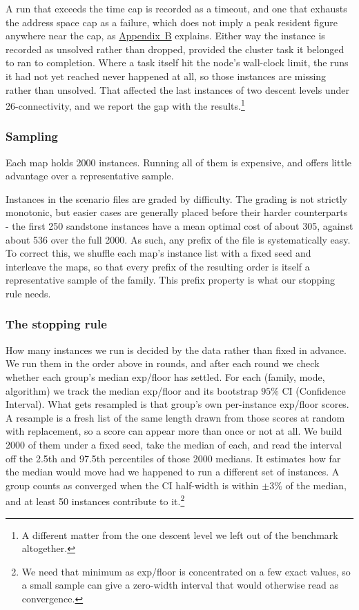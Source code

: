 \documentclass[letterpaper]{article} %
\begin{document}
A run that exceeds the time cap is recorded as a timeout, and one that exhausts the address space cap as a failure, which does not imply a peak resident figure anywhere near the cap, as \hyperref[app:b]{Appendix~B} explains. Either way the instance is recorded as unsolved rather than dropped, provided the cluster task it belonged to ran to completion. Where a task itself hit the node's wall-clock limit, the runs it had not yet reached never happened at all, so those instances are missing rather than unsolved. That affected the last instances of two descent levels under 26-connectivity, and we report the gap with the results.\footnote{A different matter from the one descent level we left out of the benchmark altogether.}

\subsubsection{Sampling}
Each map holds 2000 instances. Running all of them is expensive, and offers little advantage over a representative sample.

Instances in the scenario files are graded by difficulty. The grading is not strictly monotonic, but easier cases are generally placed before their harder counterparts - the first 250 sandstone instances have a mean optimal cost of about 305, against about 536 over the full 2000. As such, any prefix of the file is systematically easy. To correct this, we shuffle each map's instance list with a fixed seed and interleave the maps, so that every prefix of the resulting order is itself a representative sample of the family. This prefix property is what our stopping rule needs.

\subsubsection{The stopping rule}
How many instances we run is decided by the data rather than fixed in advance. We run them in the order above in rounds, and after each round we check whether each group's median exp/floor has settled. For each (family, mode, algorithm) we track the median exp/floor and its bootstrap $95\%$ CI (Confidence Interval). What gets resampled is that group's own per-instance exp/floor scores. A resample is a fresh list of the same length drawn from those scores at random with replacement, so a score can appear more than once or not at all. We build 2000 of them under a fixed seed, take the median of each, and read the interval off the 2.5th and 97.5th percentiles of those 2000 medians. It estimates how far the median would move had we happened to run a different set of instances. A group counts as converged when the CI half-width is within $\pm3\%$ of the median, and at least 50 instances contribute to it.\footnote{We need that minimum as exp/floor is concentrated on a few exact values, so a small sample can give a zero-width interval that would otherwise read as convergence.}
\end{document}
